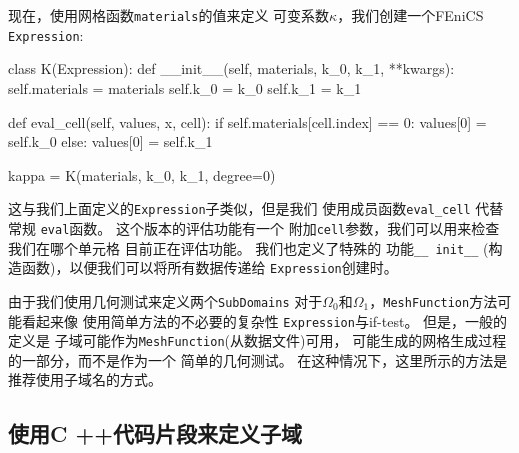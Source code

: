 现在，使用网格函数\texttt{materials}的值来定义
可变系数$\kappa$，我们创建一个FEniCS \texttt{Expression}:

\begin{python}
class K(Expression):
    def __init__(self, materials, k_0, k_1, **kwargs):
        self.materials = materials
        self.k_0 = k_0
        self.k_1 = k_1

def eval_cell(self, values, x, cell):
        if self.materials[cell.index] == 0:
            values[0] = self.k_0
        else:
            values[0] = self.k_1

kappa = K(materials, k_0, k_1, degree=0)
\end{python}

这与我们上面定义的\texttt{Expression}子类似，但是我们
使用成员函数\verb!eval_cell! 代替常规
\texttt{eval}函数。 这个版本的评估功能有一个
附加\texttt{cell}参数，我们可以用来检查我们在哪个单元格
目前正在评估功能。 我们也定义了特殊的
功能\verb!__ init__! (构造函数)，以便我们可以将所有数据传递给
\texttt{Expression}创建时。

由于我们使用几何测试来定义两个\texttt{SubDomains}
对于$\Omega_0$和$\Omega_1$，\texttt{MeshFunction}方法可能看起来像
使用简单方法的不必要的复杂性
\texttt{Expression}与if-test。 但是，一般的定义是
子域可能作为\texttt{MeshFunction}(从数据文件)可用，
可能生成的网格生成过程的一部分，而不是作为一个
简单的几何测试。 在这种情况下，这里所示的方法是
推荐使用子域名的方式。


\subsection{使用C ++代码片段来定义子域}
